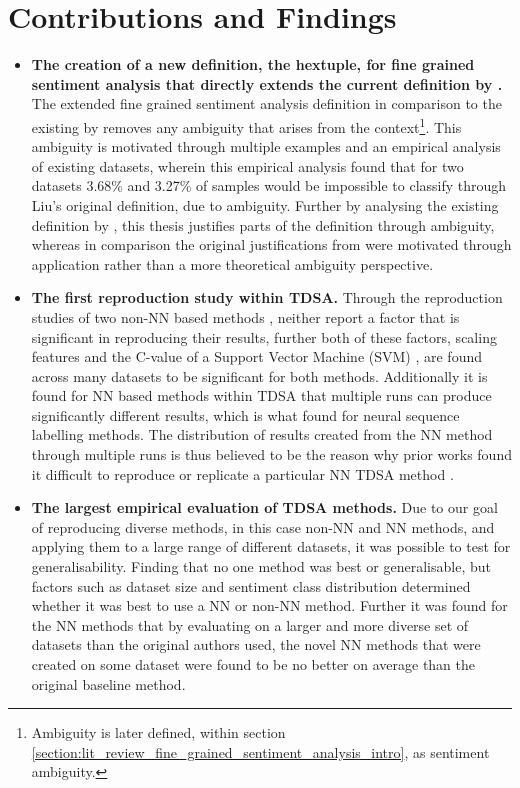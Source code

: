 \section{Contributions and Findings}
\begin{itemize}
    \item \textbf{The creation of a new definition, the hextuple, for fine grained sentiment analysis that directly extends the current definition by \citet{liu2015sentiment}.}\newline
    The extended fine grained sentiment analysis definition in comparison to the existing by \citet{liu2015sentiment} removes any ambiguity that arises from the context\footnote{Ambiguity is later defined, within section \ref{section:lit_review_fine_grained_sentiment_analysis_intro}, as sentiment ambiguity.}. This ambiguity is motivated through multiple examples and an empirical analysis of existing datasets, wherein this empirical analysis found that for two datasets 3.68\% and 3.27\% of samples would be impossible to classify through Liu's \citep{liu2015sentiment} original definition, due to ambiguity. Further by analysing the existing definition by \citet{liu2015sentiment}, this thesis justifies parts of the definition through ambiguity, whereas in comparison the original justifications from \citet{liu2015sentiment} were motivated through application rather than a more theoretical ambiguity perspective.  
    \item \textbf{The first reproduction study within TDSA.}\newline
    Through the reproduction studies of two non-NN based methods \citep{vo2015target, wang-etal-2017-tdparse}, neither report a factor that is significant in reproducing their results, further both of these factors, scaling features and the C-value of a Support Vector Machine (SVM) \citep{chang2011libsvm}, are found across many datasets to be significant for both methods. Additionally it is found for NN based methods within TDSA that multiple runs can produce significantly different results, which is what \citet{reimers-gurevych-2017-reporting} found for neural sequence labelling methods. The distribution of results created from the NN method through multiple runs is thus believed to be the reason why prior works found it difficult to reproduce or replicate a particular NN TDSA method \citep{tang-etal-2016-effective}.
    \item \textbf{The largest empirical evaluation of TDSA methods.}\newline
    Due to our goal of reproducing diverse methods, in this case non-NN and NN methods, and applying them to a large range of different datasets, it was possible to test for generalisability. Finding that no one method was best or generalisable, but factors such as dataset size and sentiment class distribution determined whether it was best to use a NN or non-NN method. Further it was found for the NN methods that by evaluating on a larger and more diverse set of datasets than the original authors used, the novel NN methods that were created on some dataset were found to be no better on average than the original baseline method.

\end{itemize}
